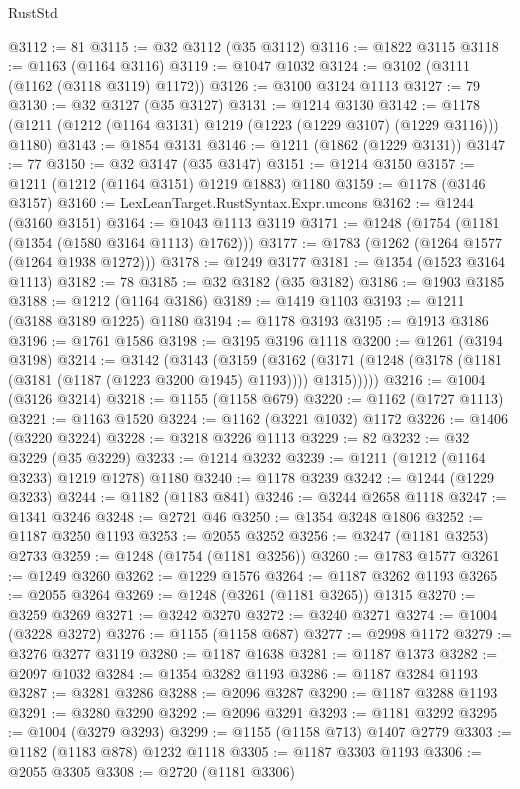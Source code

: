 \begin{lexlean}{RustStd}
\begin{coremodule}
@3112 := 81
@3115 := @32 @3112 (@35 @3112)
@3116 := @1822 @3115
@3118 := @1163 (@1164 @3116)
@3119 := @1047 @1032
@3124 := @3102 (@3111 (@1162 (@3118 @3119) @1172))
@3126 := @3100 @3124 @1113
@3127 := 79
@3130 := @32 @3127 (@35 @3127)
@3131 := @1214 @3130
@3142 := @1178 (@1211 (@1212 (@1164 @3131) @1219 (@1223 (@1229 @3107) (@1229 @3116))) @1180)
@3143 := @1854 @3131
@3146 := @1211 (@1862 (@1229 @3131))
@3147 := 77
@3150 := @32 @3147 (@35 @3147)
@3151 := @1214 @3150
@3157 := @1211 (@1212 (@1164 @3151) @1219 @1883) @1180
@3159 := @1178 (@3146 @3157)
@3160 := LexLeanTarget.RustSyntax.Expr.uncons
@3162 := @1244 (@3160 @3151)
@3164 := @1043 @1113 @3119
@3171 := @1248 (@1754 (@1181 (@1354 (@1580 @3164 @1113) @1762)))
@3177 := @1783 (@1262 (@1264 @1577 (@1264 @1938 @1272)))
@3178 := @1249 @3177
@3181 := @1354 (@1523 @3164 @1113)
@3182 := 78
@3185 := @32 @3182 (@35 @3182)
@3186 := @1903 @3185
@3188 := @1212 (@1164 @3186)
@3189 := @1419 @1103
@3193 := @1211 (@3188 @3189 @1225) @1180
@3194 := @1178 @3193
@3195 := @1913 @3186
@3196 := @1761 @1586
@3198 := @3195 @3196 @1118
@3200 := @1261 (@3194 @3198)
@3214 := @3142
    (@3143
      (@3159
        (@3162 (@3171 (@1248 (@3178 (@1181 (@3181 (@1187 (@1223 @3200 @1945) @1193)))) @1315)))))
@3216 := @1004 (@3126 @3214)
@3218 := @1155 (@1158 @679)
@3220 := @1162 (@1727 @1113)
@3221 := @1163 @1520
@3224 := @1162 (@3221 @1032) @1172
@3226 := @1406 (@3220 @3224)
@3228 := @3218 @3226 @1113
@3229 := 82
@3232 := @32 @3229 (@35 @3229)
@3233 := @1214 @3232
@3239 := @1211 (@1212 (@1164 @3233) @1219 @1278) @1180
@3240 := @1178 @3239
@3242 := @1244 (@1229 @3233)
@3244 := @1182 (@1183 @841)
@3246 := @3244 @2658 @1118
@3247 := @1341 @3246
@3248 := @2721 @46
@3250 := @1354 @3248 @1806
@3252 := @1187 @3250 @1193
@3253 := @2055 @3252
@3256 := @3247 (@1181 @3253) @2733
@3259 := @1248 (@1754 (@1181 @3256))
@3260 := @1783 @1577
@3261 := @1249 @3260
@3262 := @1229 @1576
@3264 := @1187 @3262 @1193
@3265 := @2055 @3264
@3269 := @1248 (@3261 (@1181 @3265)) @1315
@3270 := @3259 @3269
@3271 := @3242 @3270
@3272 := @3240 @3271
@3274 := @1004 (@3228 @3272)
@3276 := @1155 (@1158 @687)
@3277 := @2998 @1172
@3279 := @3276 @3277 @3119
@3280 := @1187 @1638
@3281 := @1187 @1373
@3282 := @2097 @1032
@3284 := @1354 @3282 @1193
@3286 := @1187 @3284 @1193
@3287 := @3281 @3286
@3288 := @2096 @3287
@3290 := @1187 @3288 @1193
@3291 := @3280 @3290
@3292 := @2096 @3291
@3293 := @1181 @3292
@3295 := @1004 (@3279 @3293)
@3299 := @1155 (@1158 @713) @1407 @2779
@3303 := @1182 (@1183 @878) @1232 @1118
@3305 := @1187 @3303 @1193
@3306 := @2055 @3305
@3308 := @2720 (@1181 @3306)

\end{coremodule}
\end{lexlean}
